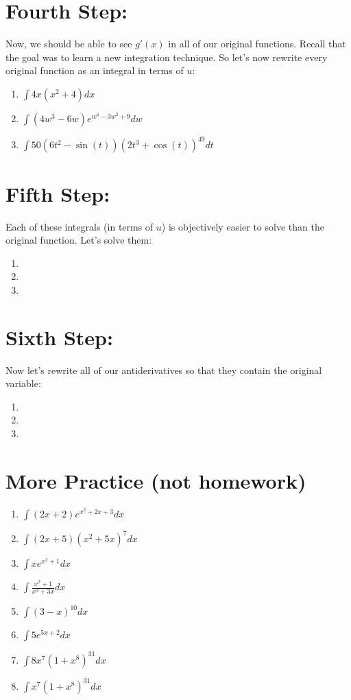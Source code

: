 \documentclass{article}[12pt]
\theoremstyle{definition}
\theoremstyle{example}
\theoremstyle{theorem}
\begin{document}
\section{Fourth Step:}
Now, we should be able to see $g'(x)$ in all of our original functions. Recall that the goal was to learn a new integration technique. So let's now rewrite every original function as an integral in terms of $u$: 
\begin{enumerate}
\item $\int4x(x^2+4)dx$
\vspace{1.5cm}
\item $\int(4w^3-6w)e^{w^4-3w^2+9}dw$
\vspace{1.5cm}
\item $\int50(6t^2-\sin(t))(2t^3+\cos(t))^{49}dt$
\vspace{1.5cm}

\end{enumerate}
\section{Fifth Step:}
Each of these integrals (in terms of $u$) is objectively easier to solve than the original function. Let's solve them:
\begin{enumerate}
\item 
\item 
\item 
\end{enumerate}
\section{Sixth Step:}
Now let's rewrite all of our antiderivatives so that they contain the original variable: 
\begin{enumerate}
\item 
\item 

\item 
\end{enumerate}
\section{More Practice (not homework)}
\begin{enumerate}
\item $\int(2x+2)e^{x^2+2x+3}dx$
\item $\int(2x+5)(x^2+5x)^7dx$
\item $\int xe^{x^2+1}dx$
\item $\int \frac{x^2+1}{x^3+3x}dx$
\item $\int (3-x)^{10}dx$
\item $\int 5e^{5x+2}dx$
\item $\int 8x^7(1+x^8)^31dx$
\item $\int x^7(1+x^8)^31dx$
\end{enumerate}
\end{document}
